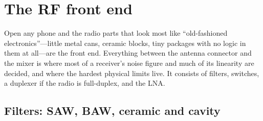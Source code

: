 \section{The RF front end}
\label{sec:ch07:frontend}

Open any phone and the radio parts that look most like ``old-fashioned electronics''---little metal
cans, ceramic blocks, tiny packages with no logic in them at all---are the front end. Everything
between the antenna connector and the mixer is where most of a receiver's noise figure and much of its
linearity are decided, and where the hardest physical limits live. It consists of filters, switches, a
duplexer if the radio is full-duplex, and the LNA.


\subsection{Filters: SAW, BAW, ceramic and cavity}

